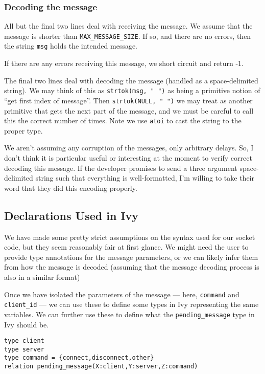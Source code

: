\documentclass[11pt]{article}
\begin{document}
\subsubsection{Decoding the message}
\label{sec:org0b7f312}
All but the final two lines deal with receiving the message. We assume that the message is shorter than \texttt{MAX\_MESSAGE\_SIZE}. If so, and there are no errors, then the string \texttt{msg} holds the intended message.

If there are any errors receiving this message, we short circuit and return -1.

The final two lines deal with decoding the message (handled as a space-delimited string). We may think of this as \texttt{strtok(msg, " ")} as being a primitive notion of ``get first index of message''. Then \texttt{strtok(NULL, " ")} we may treat as another primitive that gets the next part of the message, and we must be careful to call this the correct number of times. Note we use \texttt{atoi} to cast the string to the proper type.

We aren't assuming any corruption of the messages, only arbitrary delays. So, I don't think it is particular useful or interesting at the moment to verify correct decoding this message. If the developer promises to send a three argument space-delimited string such that everything is well-formatted, I'm willing to take their word that they did this encoding properly.

\subsection{Declarations Used in Ivy}
\label{sec:org10dc445}
We have made some pretty strict assumptions on the syntax used for our socket code, but they seem reasonably fair at first glance. We might need the user to provide type annotations for the message parameters, or we can likely infer them from how the message is decoded (assuming that the message decoding process is also in a similar format)

Once we have isolated the parameters of the message --- here, \texttt{command} and \texttt{client\_id} --- we can use these to define some types in Ivy representing the same variables. We can further use these to define what the \texttt{pending\_message} type in Ivy should be.

\begin{verbatim}
type client
type server
type command = {connect,disconnect,other}
relation pending_message(X:client,Y:server,Z:command)
\end{verbatim}
\end{document}
